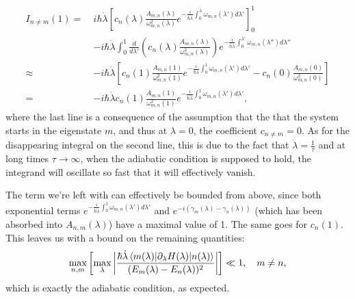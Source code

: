 \documentclass[a4paper,oneside,11pt]{book}
\newcommand{\dlambda}{\partial_{\lambda}}
\newcommand{\dotlambda}{\dot{\lambda}}
\begin{document}
    \begin{equation}\label{eq:final_adiabatic_integral}
        \begin{aligned}
            I_{n \neq m}(1) = \: &i\hbar \dotlambda \left[ c_n(\lambda) \frac{A_{m,n}(\lambda)}{\omega_{m,n}^2(\lambda)} e^{-\frac{i}{\hbar \dotlambda}\int_0^{\lambda}\omega_{m,n}(\lambda')d \lambda'}  \right]_0^1 \\ 
            \quad &-i\hbar \dotlambda \int_0^1 \frac{d}{d\lambda'} \left(c_n(\lambda) \frac{A_{m,n}(\lambda)}{\omega_{m,n}^2(\lambda)} \right) e^{-\frac{i}{\hbar \dotlambda}\int_0^{\lambda'}\omega_{m,n}(\lambda'')d \lambda''} \\
            \approx &-i\hbar \dotlambda \left[ c_n(1) \frac{A_{m,n}(1)}{\omega_{m,n}^2(1)}e^{-\frac{i}{\hbar \dotlambda}\int_0^{1}\omega_{m,n}(\lambda')d \lambda'} - c_n(0) \frac{A_{m,n}(0)}{\omega_{m,n}^2(0)} \right] \\
            = &-i\hbar \dotlambda c_n(1) \frac{A_{m,n}(1)}{\omega_{m,n}^2(1)}e^{-\frac{i}{\hbar \dotlambda}\int_0^{1}\omega_{m,n}(\lambda')d \lambda'},
        \end{aligned}
    \end{equation}
    where the last line is a consequence of the assumption that the that the system starts in the eigenstate $m$, and thus at $\lambda = 0$, the coefficient $c_{n \neq m} = 0$. As for the disappearing integral on the second line, this is due to the fact that $\dotlambda = \frac{1}{\tau}$ and at long times $\tau \rightarrow \infty$, when the adiabatic condition is supposed to hold, the integrand will oscillate so fast that it will effectively vanish\cite{kahane_generalizations_1980}. 

    The term we're left with can effectively be bounded from above, since both exponential terms $e^{-\frac{i}{\hbar \dotlambda}\int_0^{1}\omega_{m,n}(\lambda')d \lambda'}$ and $e^{-i(\gamma_m(\lambda) - \gamma_n(\lambda))}$ (which has been absorbed into $A_{n,m}(\lambda)$) have a maximal value of 1. The same goes for $c_n(1)$. This leaves us with a bound on the remaining quantities:
    \begin{equation}\label{eq:adiabatic_criterion}
        \max _{n,m}\left[\max_{\lambda} \left| \frac{\hbar \dotlambda \mel{m(\lambda)}{\dlambda H(\lambda)}{n(\lambda)}}{(E_m(\lambda) - E_n(\lambda))^2} \right| \right] \ll 1, \quad m \neq n,
    \end{equation}
    which is exactly the adiabatic condition, as expected. 
\end{document}
